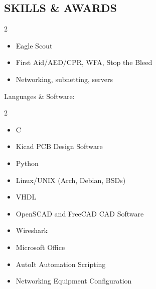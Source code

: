 \documentclass[line,mmmargin]{res}
\begin{document}
\begin{resume}
\section{SKILLS \& AWARDS} 
		\begin{multicols}{2}
			\begin{itemize}
				\itemsep -2pt
				\item[] Eagle Scout
                \item[] First Aid/AED/CPR, WFA, Stop the Bleed
                \item[] Networking, subnetting, servers
			\end{itemize}
		\end{multicols}
	\vspace{-10pt}
	{Languages \& Software:} %
		\begin{multicols}{2}
			\begin{itemize}
				\itemsep -2pt
				\item[] C
				\item[] Kicad PCB Design Software
				\item[] Python
                \item[] Linux/UNIX (Arch, Debian, BSDs)
				\item[] VHDL
				\item[] OpenSCAD and FreeCAD CAD Software
				\item[] Wireshark
				\item[] Microsoft Office

				\item[] AutoIt Automation Scripting
				\item[] Networking Equipment Configuration


\end{itemize}
\end{multicols}
\end{resume}
\end{document}
